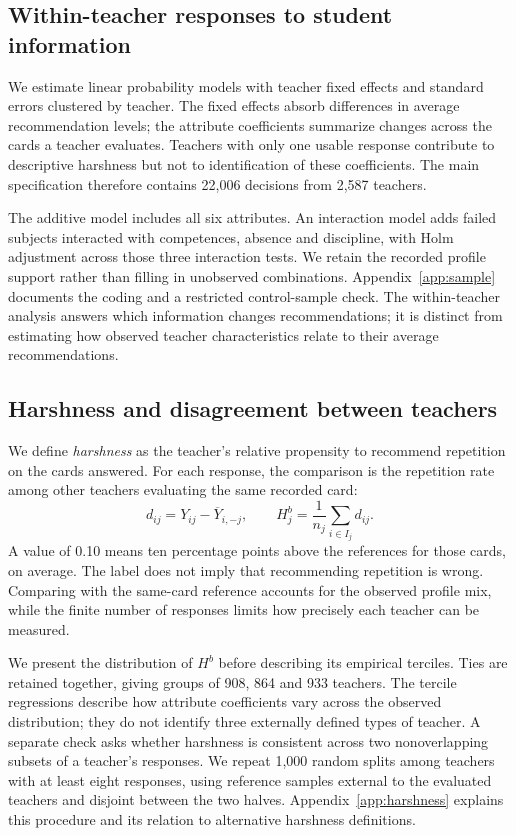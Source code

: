 \subsection{Within-teacher responses to student information}
We estimate linear probability models with teacher fixed effects and standard errors clustered by teacher. The fixed effects absorb differences in average recommendation levels; the attribute coefficients summarize changes across the cards a teacher evaluates. Teachers with only one usable response contribute to descriptive harshness but not to identification of these coefficients. The main specification therefore contains 22,006 decisions from 2,587 teachers.

The additive model includes all six attributes. An interaction model adds failed subjects interacted with competences, absence and discipline, with Holm adjustment across those three interaction tests. We retain the recorded profile support rather than filling in unobserved combinations. Appendix~\ref{app:sample} documents the coding and a restricted control-sample check. The within-teacher analysis answers which information changes recommendations; it is distinct from estimating how observed teacher characteristics relate to their average recommendations.

\subsection{Harshness and disagreement between teachers}
We define \textit{harshness} as the teacher's relative propensity to recommend repetition on the cards answered. For each response, the comparison is the repetition rate among other teachers evaluating the same recorded card:
\[
d_{ij}=Y_{ij}-\overline Y_{i,-j},\qquad
H^b_j=\frac{1}{n_j}\sum_{i\in I_j}d_{ij}.
\]
A value of 0.10 means ten percentage points above the references for those cards, on average. The label does not imply that recommending repetition is wrong. Comparing with the same-card reference accounts for the observed profile mix, while the finite number of responses limits how precisely each teacher can be measured.

We present the distribution of $H^b$ before describing its empirical terciles. Ties are retained together, giving groups of 908, 864 and 933 teachers. The tercile regressions describe how attribute coefficients vary across the observed distribution; they do not identify three externally defined types of teacher. A separate check asks whether harshness is consistent across two nonoverlapping subsets of a teacher's responses. We repeat 1,000 random splits among teachers with at least eight responses, using reference samples external to the evaluated teachers and disjoint between the two halves. Appendix~\ref{app:harshness} explains this procedure and its relation to alternative harshness definitions.

